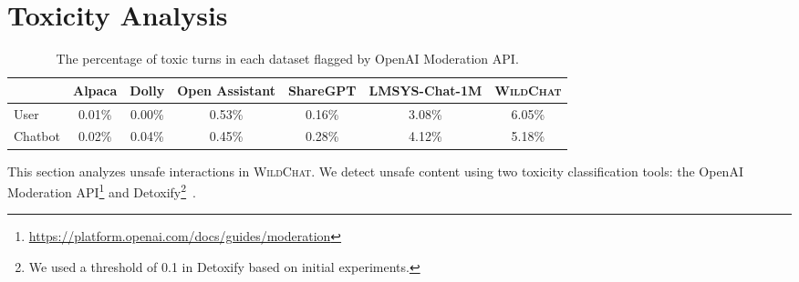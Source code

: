 \documentclass{article} %
\newcommand{\corpus}{\textsc{WildChat}\xspace}
\begin{document}
\section{Toxicity Analysis}
\begin{table}[t]
\centering
\caption{\label{tab:toxicity-all-datasets}The percentage of toxic turns in each dataset flagged by OpenAI Moderation API.}
\begin{tabular}{@{}lcccccc@{}}
\toprule
      & Alpaca & Dolly & Open Assistant &  ShareGPT & LMSYS-Chat-1M & \corpus \\ \midrule
User & 0.01\%   & 0.00\% & 0.53\% & 0.16\%  & 3.08\% & 6.05\% \\
Chatbot & 0.02\%   & 0.04\%  & 0.45\%  & 0.28\% & 4.12\% & 5.18\% \\
\bottomrule
\end{tabular}
\end{table}
This section analyzes unsafe interactions in \corpus. %
We detect unsafe content using two toxicity classification tools: the OpenAI Moderation API\footnote{\url{https://platform.openai.com/docs/guides/moderation}} and Detoxify\footnote{We used a threshold of 0.1 in Detoxify based on initial experiments.}~\citep{Detoxify}.
\end{document}
